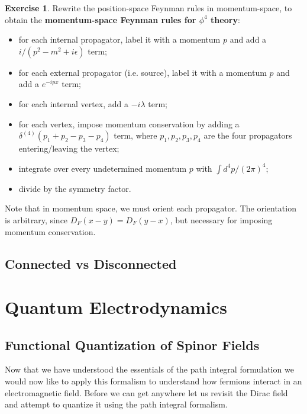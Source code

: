\documentclass{report}
\theoremstyle{plain}
\theoremstyle{definition}
\newtheorem{exercise}{Exercise}[section]
\theoremstyle{remark}
\begin{document}
\begin{exercise}
  Rewrite the position-space Feynman rules in momentum-space, to
  obtain the {\bf momentum-space Feynman rules for $\phi^4$ theory}:
  \begin{itemize}
  \item for each internal propagator, label it with a momentum $p$ and
    add a $i/(p^2 - m^2 + i\epsilon)$ term;
  \item for each external propagator (i.e. source), label it with a
    momentum $p$ and add a $e^{-ipx}$ term;
  \item for each internal vertex, add a $-i\lambda$ term;
  \item for each vertex, impose momentum conservation by adding a
    $\delta^{(4)}(p_1 + p_2 - p_3 - p_4)$ term, where
    $p_1, p_2, p_3, p_4$ are the four propagators entering/leaving the
    vertex;
  \item integrate over every undetermined momentum $p$ with
    $\int d^4p/(2\pi)^4$;
  \item divide by the symmetry factor.
  \end{itemize}
  Note that in momentum space, we must orient each propagator. The
  orientation is arbitrary, since $D_F(x - y) = D_F(y - x)$, but
  necessary for imposing momentum conservation.
\end{exercise}

\section{Connected vs Disconnected}



\chapter{Quantum Electrodynamics}
\section{Functional Quantization of Spinor Fields}
Now that we have understood the essentials of the path integral formulation
we would now like to apply this formalism to understand how fermions
interact in an electromagnetic field. Before we can get anywhere let us
revisit the Dirac field and attempt to quantize it using the path integral
formalism. 
\end{document}
